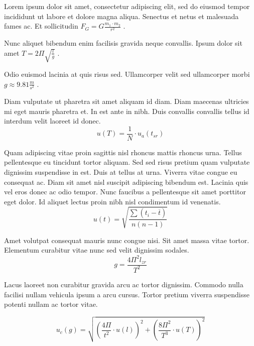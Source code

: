 \documentclass{article}
\begin{document}
Lorem ipsum dolor sit amet, consectetur adipiscing elit, sed do eiusmod tempor incididunt ut labore et dolore magna aliqua. Senectus et netus et malesuada fames ac. Et sollicitudin 
\begin{math}
	F_{G}=G\frac{m_1\cdot m_2}{r^2}
\end{math}
.\newline
 
Nunc aliquet bibendum enim facilisis gravida neque convallis. Ipsum dolor sit amet
$ T=2\Pi \sqrt{\frac{l}{g}} $
.\newline
    
Odio euismod lacinia at quis risus sed. Ullamcorper velit sed ullamcorper morbi 
\( g\approx 9.81\frac{m}{s^2} \)
.\newline

Diam vulputate ut pharetra sit amet aliquam id diam. Diam maecenas ultricies mi eget mauris pharetra et. In est ante in nibh. Duis convallis convallis tellus id interdum velit laoreet id donec. 
\[ u(T)=\frac{1}{N} \cdot u_a (t_{sr}) \]

Quam adipiscing vitae proin sagittis nisl rhoncus mattis rhoncus urna. Tellus pellentesque eu tincidunt tortor aliquam. Sed sed risus pretium quam vulputate dignissim suspendisse in est. Duis at tellus at urna. Viverra vitae congue eu consequat ac. Diam sit amet nisl suscipit adipiscing bibendum est. Lacinia quis vel eros donec ac odio tempor. Nunc faucibus a pellentesque sit amet porttitor eget dolor. Id aliquet lectus proin nibh nisl condimentum id venenatis.
$$ u(t)=\sqrt{\frac{\sum(t_i-\overline{t})}{n(n-1)}} $$

Amet volutpat consequat mauris nunc congue nisi. Sit amet massa vitae tortor. Elementum curabitur vitae nunc sed velit dignissim sodales. 
\begin{displaymath}
	g=\frac{4\Pi^2l_{zr}}{T^2}
\end{displaymath}

Lacus laoreet non curabitur gravida arcu ac tortor dignissim. Commodo nulla facilisi nullam vehicula ipsum a arcu cursus. Tortor pretium viverra suspendisse potenti nullam ac tortor vitae. 

\begin{equation}
	u_c(g)=\sqrt{(\frac{4\Pi}{t^2}\cdot u(l))^2+(\frac{8\Pi^2}{T^3}\cdot u(T))^2}
\end{equation}
\end{document}
